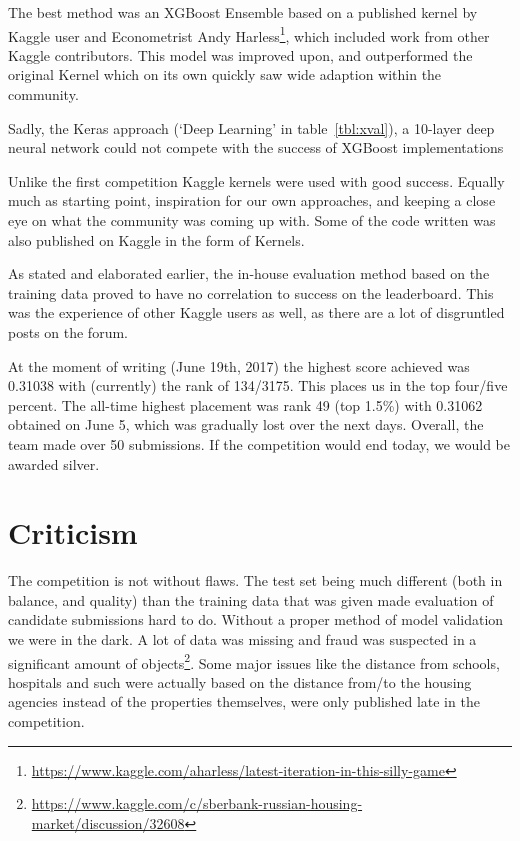 \documentclass[a4paper,11pt,twocolumn]{article}
\begin{document}
The best method was an XGBoost Ensemble based on a published kernel by Kaggle
user and Econometrist Andy
Harless\footnote{\url{https://www.kaggle.com/aharless/latest-iteration-in-this-silly-game}},
which included work from other Kaggle contributors. This model was improved
upon, and outperformed the original Kernel which on its own quickly saw wide
adaption within the community.

Sadly, the Keras approach (‘Deep Learning’ in table~\ref{tbl:xval}), a 10-layer deep neural
network could not compete with the success of XGBoost implementations

Unlike the first competition Kaggle kernels were used with good success. Equally
much as starting point, inspiration for our own approaches, and keeping a close
eye on what the community was coming up with. Some of the code written was also
published on Kaggle in the form of Kernels.

As stated and elaborated earlier, the in-house evaluation method based on the
training data proved to have no correlation to success on the leaderboard. This
was the experience of other Kaggle users as well, as there are a lot of
disgruntled posts on the forum.

At the moment of writing (June 19th, 2017) the highest score achieved was
0.31038 with (currently) the rank of 134/3175. This places us in the top
four/five percent. The all-time highest placement was rank 49 (top 1.5\%) with
0.31062 obtained on June 5, which was gradually lost over the next days.
Overall, the team made over 50 submissions. If the competition would end today,
we would be awarded silver.

\section{Criticism}
The competition is not without flaws. The test set being much different (both in
balance, and quality) than the training data that was given made evaluation of
candidate submissions hard to do. Without a proper method of model validation we
were in the dark. A lot of data was missing and fraud was suspected in a
significant amount of
objects\footnote{\url{https://www.kaggle.com/c/sberbank-russian-housing-market/discussion/32608}}.
Some major issues like the distance from schools, hospitals and such were
actually based on the distance from/to the housing agencies instead of the
properties themselves, were only published late in the competition.

\newpage
\end{document}
